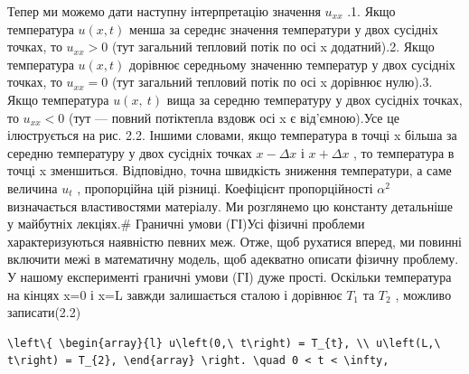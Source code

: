 \documentclass[
  ukrainian,
]{article}
\begin{document}
Тепер ми можемо дати наступну інтерпретацію значення \(u_{xx}\) .1. Якщо
температура \(u(x, t)\) менша за середнє значення температури у двох
сусідніх точках, то \(u_{xx} > 0\) (тут загальний тепловий потік по осі
x додатний).2. Якщо температура \(u(x, t)\) дорівнює середньому значенню
температур у двох сусідніх точках, то \(u_{xx} = 0\) (тут загальний
тепловий потік по осі x дорівнює нулю).3. Якщо температура
\(u\left(x,\ t\right)\) вища за середню температуру у двох сусідніх
точках, то \(u_{xx}<0\) (тут --- повний потіктепла вздовж осі x є
від'ємною).Усе це ілюструється на рис. 2.2. Іншими словами, якщо
температура в точці x більша за середню температуру у двох сусідніх
точках \(x - \Delta x\) і \(x + \Delta x\) , то температура в точці x
зменшиться. Відповідно, точна швидкість зниження температури, а саме
величина \(u_t\) , пропорційна цій різниці. Коефіцієнт пропорційності
\(\alpha^2\) визначається властивостями матеріалу. Ми розглянемо цю
константу детальніше у майбутніх лекціях.\# Граничні умови (ГІ)Усі
фізичні проблеми характеризуються наявністю певних меж. Отже, щоб
рухатися вперед, ми повинні включити межі в математичну модель, щоб
адекватно описати фізичну проблему. У нашому експерименті граничні умови
(ГІ) дуже прості. Оскільки температура на кінцях x=0 і x=L завжди
залишається сталою і дорівнює \(T_1\) та \(T_2\) , можливо записати(2.2)

\begin{verbatim}
\left\{ \begin{array}{l} u\left(0,\ t\right) = T_{t}, \\ u\left(L,\ t\right) = T_{2}, \end{array} \right. \quad 0 < t < \infty,
\end{verbatim}
\end{document}
